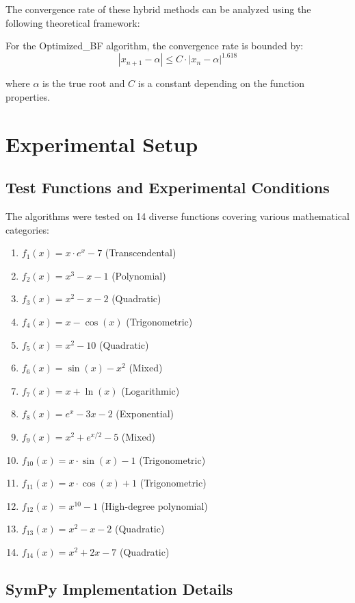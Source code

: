 \documentclass[reprint, amsmath, amssymb, aps, prl]{revtex4-2}
\begin{document}
The convergence rate of these hybrid methods can be analyzed using the following theoretical framework:

For the Optimized\_BF algorithm, the convergence rate is bounded by:
\begin{equation}
|x_{n+1} - \alpha| \leq C \cdot |x_n - \alpha|^{1.618}
\end{equation}

where $\alpha$ is the true root and $C$ is a constant depending on the function properties.

\section{Experimental Setup}

\subsection{Test Functions and Experimental Conditions}

The algorithms were tested on 14 diverse functions covering various mathematical categories:

\begin{enumerate}
    \item $f_1(x) = x \cdot e^x - 7$ (Transcendental)
    \item $f_2(x) = x^3 - x - 1$ (Polynomial)
    \item $f_3(x) = x^2 - x - 2$ (Quadratic)
    \item $f_4(x) = x - \cos(x)$ (Trigonometric)
    \item $f_5(x) = x^2 - 10$ (Quadratic)
    \item $f_6(x) = \sin(x) - x^2$ (Mixed)
    \item $f_7(x) = x + \ln(x)$ (Logarithmic)
    \item $f_8(x) = e^x - 3x - 2$ (Exponential)
    \item $f_9(x) = x^2 + e^{x/2} - 5$ (Mixed)
    \item $f_{10}(x) = x \cdot \sin(x) - 1$ (Trigonometric)
    \item $f_{11}(x) = x \cdot \cos(x) + 1$ (Trigonometric)
    \item $f_{12}(x) = x^{10} - 1$ (High-degree polynomial)
    \item $f_{13}(x) = x^2 - x - 2$ (Quadratic)
    \item $f_{14}(x) = x^2 + 2x - 7$ (Quadratic)
\end{enumerate}

\subsection{SymPy Implementation Details}
\end{document}
